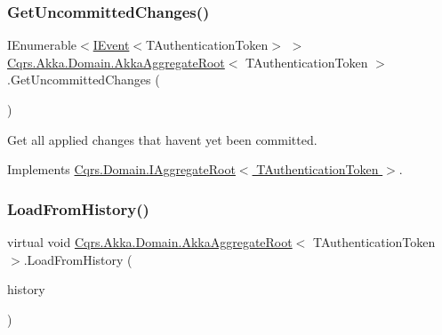 \subsubsection{\texorpdfstring{Get\+Uncommitted\+Changes()}{GetUncommittedChanges()}}
{\footnotesize\ttfamily I\+Enumerable$<$\hyperlink{interfaceCqrs_1_1Events_1_1IEvent}{I\+Event}$<$T\+Authentication\+Token$>$ $>$ \hyperlink{classCqrs_1_1Akka_1_1Domain_1_1AkkaAggregateRoot}{Cqrs.\+Akka.\+Domain.\+Akka\+Aggregate\+Root}$<$ T\+Authentication\+Token $>$.Get\+Uncommitted\+Changes (\begin{DoxyParamCaption}{ }\end{DoxyParamCaption})}



Get all applied changes that haven\textquotesingle{}t yet been committed. 



Implements \hyperlink{interfaceCqrs_1_1Domain_1_1IAggregateRoot_a22fda414613f5ac0d4371554d7d6473b_a22fda414613f5ac0d4371554d7d6473b}{Cqrs.\+Domain.\+I\+Aggregate\+Root$<$ T\+Authentication\+Token $>$}.

\mbox{\label{classCqrs_1_1Akka_1_1Domain_1_1AkkaAggregateRoot_af6d84b07d4e9475bb88e769ac9081830_af6d84b07d4e9475bb88e769ac9081830}} 
\subsubsection{\texorpdfstring{Load\+From\+History()}{LoadFromHistory()}}
{\footnotesize\ttfamily virtual void \hyperlink{classCqrs_1_1Akka_1_1Domain_1_1AkkaAggregateRoot}{Cqrs.\+Akka.\+Domain.\+Akka\+Aggregate\+Root}$<$ T\+Authentication\+Token $>$.Load\+From\+History (\begin{DoxyParamCaption}\item[{I\+Enumerable$<$ \hyperlink{interfaceCqrs_1_1Events_1_1IEvent}{I\+Event}$<$ T\+Authentication\+Token $>$$>$}]{history }\end{DoxyParamCaption})\hspace{0.3cm}{\ttfamily [virtual]}}




